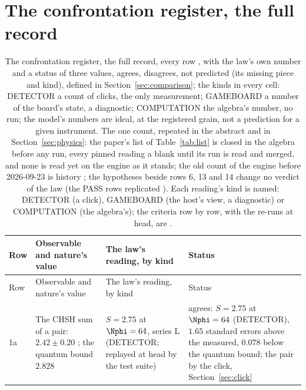 \section{The confrontation register, the full record}\label{app:register}

{\scriptsize\setlength{\tabcolsep}{3pt}
\begin{longtable}{L{0.3in}L{2.0in}L{1.5in}L{2.2in}}
\caption{\label{tab:nature}The confrontation register, the full record, every row \cite{nature}, with the law's own number and a status of three values, agrees, disagrees, not predicted (its missing piece and kind), defined in Section~\ref{sec:comparison}; the kinds in every cell: DETECTOR a count of clicks, the only measurement; GAMEBOARD a number of the board's state, a diagnostic; COMPUTATION the algebra's number, no run; the model's numbers are ideal, at the registered grain, not a prediction for a given instrument. The one count, repeated in the abstract and in Section~\ref{sec:physics}: the paper's list of Table~\ref{tab:list} is closed in the algebra before any run, every pinned reading a blank until its run is read and merged, and none is read yet on the engine as it stands; the old count of the engine before 2026-09-23 is history \cite{records}; the hypotheses beside rows 6, 13 and 14 change no verdict of the law (the PASS rows replicated \cite{replications}). Each reading's kind is named: DETECTOR (a click), GAMEBOARD (the host's view, a diagnostic) or COMPUTATION (the algebra's); the criteria row by row, with the re-runs at head, are \cite{criteria}.}\\
\toprule
Row & Observable and nature's value & The law's reading, by kind & Status \\
\midrule
\endfirsthead
\toprule
Row & Observable and nature's value & The law's reading, by kind & Status \\
\midrule
\endhead
\bottomrule
\endlastfoot
1a & The CHSH sum of a pair: $2.42 \pm 0.20$ \cite{hensen2015}; the quantum bound $2.828$ & $S = 2.75$ at $\Nphi = 64$, series L (DETECTOR; replayed at head by the test suite) & agrees: $S = 2.75$ at $\Nphi = 64$ (DETECTOR), $1.65$ standard errors above the measured, $0.078$ below the quantum bound; the pair by the click, Section~\ref{sec:click} \cite[section 10]{clickframe} \\

\end{longtable}}
